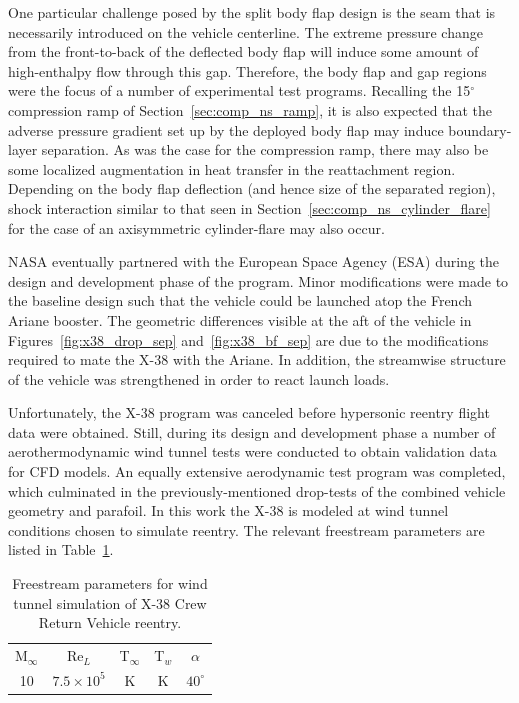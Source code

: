 One particular challenge posed by the split body flap design is the seam that is necessarily introduced on the vehicle centerline.  The extreme pressure change from the front-to-back of the deflected body flap will induce some amount of high-enthalpy flow through this gap.  Therefore, the body flap and gap regions  were the focus of a number of experimental test programs.  Recalling the 15$^\circ$ compression ramp of Section~\ref{sec:comp_ns_ramp}, it is also expected that the adverse pressure gradient set up by the deployed body flap may induce boundary-layer separation.  As was the case for the compression ramp, there may also be some localized augmentation in heat transfer in the reattachment region.  Depending on the body flap deflection (and hence size of the separated region), shock interaction similar to that seen in Section~\ref{sec:comp_ns_cylinder_flare} for the case of an axisymmetric cylinder-flare may also occur.

NASA eventually partnered with the European Space Agency (ESA) during the design and development phase of the program.  Minor modifications were made to the baseline design such that the vehicle could be launched atop the French Ariane booster.  The geometric differences visible at the aft of the vehicle in Figures~\ref{fig:x38_drop_sep} and~\ref{fig:x38_bf_sep} are due to the modifications required to mate the X-38 with the Ariane.  In addition, the streamwise structure of the vehicle was strengthened in order to react launch loads.


Unfortunately, the X-38 program was canceled before hypersonic reentry flight data were obtained.  Still, during its design and development phase a number of aerothermodynamic wind tunnel tests were conducted to obtain validation data for CFD models.  An equally extensive aerodynamic test program was completed, which culminated in the previously-mentioned drop-tests of the combined vehicle geometry and parafoil. In this work the X-38 is modeled at wind tunnel conditions chosen to simulate reentry.  The relevant freestream parameters are listed in Table~\ref{table:x38-freestream-parameters}.
\begin{table}[hbtp]
  \begin{center}
    \caption{Freestream parameters for wind tunnel simulation of X-38 Crew Return Vehicle reentry.\label{table:x38-freestream-parameters}}
    \vspace{1em}
    \begin{tabular}{ccccc} \hline \hline
      M$_\infty$ & Re$_L$           & T$_\infty$ & T$_w$   & $\alpha$   \\
      10         & $7.5\times 10^5$ & \unit[50]{K}   & \unit[300]{K} & $40^\circ$ \\ \hline
    \end{tabular}
  \end{center}
\end{table}

